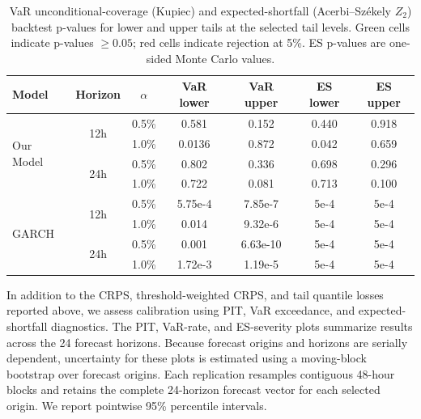 \documentclass[a4paper,fleqn]{cas-sc}
\begin{document}
\begin{table}[pos=!htbp,align=\centering]
\centering
\small
\setlength{\tabcolsep}{6pt}
\begin{tabular}{l c c c c c c}
\toprule
Model & Horizon & $\alpha$ & VaR lower & VaR upper & ES lower & ES upper \\
\midrule
\multirow{4}{*}{Our Model} & \multirow{2}{*}{12h} & 0.5\% & \cellcolor{green!35}0.581 & \cellcolor{green!35}0.152 & \cellcolor{green!35}0.440 & \cellcolor{green!35}0.918 \\
&  & 1.0\% & \cellcolor{red!35}0.0136 & \cellcolor{green!35}0.872 & \cellcolor{red!35}0.042 & \cellcolor{green!35}0.659 \\
 & \multirow{2}{*}{24h} & 0.5\% & \cellcolor{green!35}0.802 & \cellcolor{green!35}0.336 & \cellcolor{green!35}0.698 & \cellcolor{green!35}0.296 \\
 &  & 1.0\% & \cellcolor{green!35}0.722 & \cellcolor{green!35}0.081 & \cellcolor{green!35}0.713 & \cellcolor{green!35}0.100 \\
\midrule
\multirow{4}{*}{GARCH}  & \multirow{2}{*}{12h}  & 0.5\% & \cellcolor{red!35}5.75e-4 & \cellcolor{red!35}7.85e-7 & \cellcolor{red!35}5e-4 & \cellcolor{red!35}5e-4 \\
 &  & 1.0\% & \cellcolor{red!35}0.014 & \cellcolor{red!35}9.32e-6 & \cellcolor{red!35}5e-4 & \cellcolor{red!35}5e-4 \\
 & \multirow{2}{*}{24h}  & 0.5\% & \cellcolor{red!35}0.001 & \cellcolor{red!35}6.63e-10 & \cellcolor{red!35}5e-4 & \cellcolor{red!35}5e-4 \\
 &  & 1.0\% & \cellcolor{red!35}1.72e-3 & \cellcolor{red!35}1.19e-5 & \cellcolor{red!35}5e-4 & \cellcolor{red!35}5e-4 \\
\midrule
\bottomrule
\end{tabular}
\caption{VaR unconditional-coverage (Kupiec) and expected-shortfall (Acerbi--Sz\'ekely $Z_2$) backtest p-values for lower and upper tails at the selected tail levels. Green cells indicate p-values $\geq 0.05$; red cells indicate rejection at 5\%. ES p-values are one-sided Monte Carlo values.}
\label{tab:var_es_backtests_comparison}
\end{table}



In addition to the CRPS, threshold-weighted CRPS, and tail quantile losses reported above, we assess calibration using PIT, VaR exceedance, and expected-shortfall diagnostics. The PIT, VaR-rate, and ES-severity plots summarize results across the 24 forecast horizons. Because forecast origins and horizons are serially dependent, uncertainty for these plots is estimated using a moving-block bootstrap over forecast origins. Each replication resamples contiguous 48-hour blocks and retains the complete 24-horizon forecast vector for each selected origin. We report pointwise 95\% percentile intervals.
\end{document}
